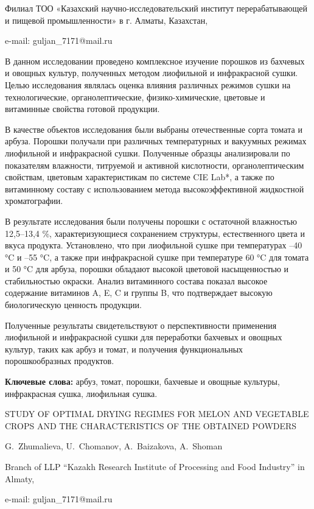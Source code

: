 \begin{affil}
Филиал ТОО «Казахский научно-исследовательский институт перерабатывающей и пищевой промышленности» в г. Алматы, Казахстан,

e-mail: guljan\_7171@mail.ru
\end{affil}

В данном исследовании проведено комплексное изучение порошков из
бахчевых и овощных культур, полученных методом лиофильной и инфракрасной
сушки. Целью исследования являлась оценка влияния различных режимов
сушки на технологические, органолептические, физико-хими\-ческие, цветовые
и витаминные свойства готовой продукции.

В качестве объектов исследования были выбраны отечественные сорта томата
и арбуза. Порошки получали при различных температурных и вакуумных
режимах лиофильной и инфракрасной сушки. Полученные образцы
анализировали по показателям влажности, титруемой и активной
кислотности, органолептическим свойствам, цветовым характеристикам по
системе CIE Lab*, а также по витаминному составу с использованием метода
высокоэффективной жидкостной хроматографии.

В результате исследования были получены порошки с остаточной влажностью
12,5--13,4 \%, характеризующиеся сохранением структуры, естественного
цвета и вкуса продукта. Установлено, что при лиофильной сушке при
температурах --40 °C и --55 °C, а также при инфракрасной сушке при
температуре 60 °C для томата и 50 °C для арбуза, порошки обладают
высокой цветовой насыщенностью и стабильностью окраски. Анализ
витаминного состава показал высокое содержание витаминов A, E, C и
группы B, что подтверждает высокую биологическую ценность продукции.

Полученные результаты свидетельствуют о перспективности применения
лиофильной и инфракрасной сушки для переработки бахчевых и овощных
культур, таких как арбуз и томат, и получения функциональных
порошкообразных продуктов.

{\bfseries Ключевые слова:} арбуз, томат, порошки, бахчевые и овощные
культуры, инфракрасная сушка, лиофильная сушка.

\begin{header}
STUDY OF OPTIMAL DRYING REGIMES FOR MELON AND VEGETABLE CROPS AND THE CHARACTERISTICS OF THE OBTAINED POWDERS

G.~Zhumalieva\envelope,
U.~Chomanov,
A.~Baizakova,
A.~Shoman
\end{header}

\begin{affil}
Branch of LLP ``Kazakh Research Institute of Processing and Food Industry'' in Almaty,

e-mail: guljan\_7171@mail.ru
\end{affil}

